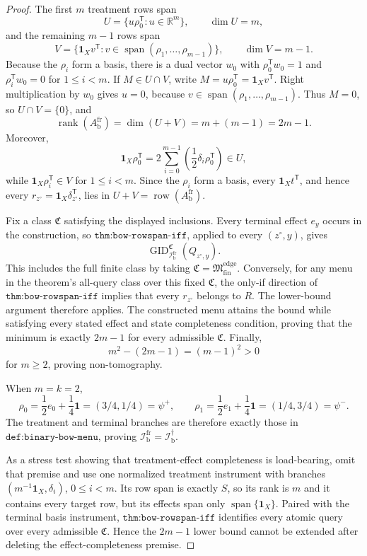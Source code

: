 \documentclass{article}
\begin{document}
\begin{proof}
The first \(m\) treatment rows span
\[
U=\{u\rho_0^{\mathsf T}:u\in\mathbb R^m\},
\qquad \dim U=m,
\]
and the remaining \(m-1\) rows span
\[
V=\{\mathbf 1_Xv^{\mathsf T}:v\in\operatorname{span}(\rho_1,\ldots,\rho_{m-1})\},
\qquad \dim V=m-1.
\]
Because the \(\rho_i\) form a basis, there is a dual vector \(w_0\) with \(\rho_0^{\mathsf T}w_0=1\) and \(\rho_i^{\mathsf T}w_0=0\) for \(1\leq i<m\).  If \(M\in U\cap V\), write \(M=u\rho_0^{\mathsf T}=\mathbf 1_Xv^{\mathsf T}\).  Right multiplication by \(w_0\) gives \(u=0\), because \(v\in\operatorname{span}(\rho_1,\ldots,\rho_{m-1})\).  Thus \(M=0\), so \(U\cap V=\{0\}\), and
\[
\operatorname{rank}(A_{\mathrm b}^{\mathrm{fr}})
=\dim(U+V)=m+(m-1)=2m-1.
\]
Moreover,
\[
\mathbf 1_X\rho_0^{\mathsf T}
=2\sum_{i=0}^{m-1}\left(\frac12\delta_i\rho_0^{\mathsf T}\right)\in U,
\]
while \(\mathbf 1_X\rho_i^{\mathsf T}\in V\) for \(1\leq i<m\).  Since the \(\rho_i\) form a basis, every \(\mathbf 1_Xt^{\mathsf T}\), and hence every \(r_{z^{\circ}}=\mathbf 1_X\delta_{z^{\circ}}^{\mathsf T}\), lies in \(U+V=\operatorname{row}(A_{\mathrm b}^{\mathrm{fr}})\).

Fix a class \(\mathfrak C\) satisfying the displayed inclusions.  Every terminal effect \(e_y\) occurs in the construction, so \(\texttt{thm:bow-rowspan-iff}\), applied to every \((z^{\circ},y)\), gives
\[
\operatorname{GID}_{\mathcal I_{\mathrm b}^{\mathrm{fr}}}^{\mathfrak C}(Q_{z^{\circ},y}).
\]
This includes the full finite class by taking \(\mathfrak C=\mathfrak M_{\mathrm{fin}}^{\mathrm{edge}}\).  Conversely, for any menu in the theorem's all-query class over this fixed \(\mathfrak C\), the only-if direction of \(\texttt{thm:bow-rowspan-iff}\) implies that every \(r_{z^{\circ}}\) belongs to \(R\).  The lower-bound argument therefore applies.  The constructed menu attains the bound while satisfying every stated effect and state completeness condition, proving that the minimum is exactly \(2m-1\) for every admissible \(\mathfrak C\).  Finally,
\[
m^2-(2m-1)=(m-1)^2>0
\]
for \(m\geq2\), proving non-tomography.

When \(m=k=2\),
\[
\rho_0=\frac12e_0+\frac14\mathbf 1=(3/4,1/4)=\psi^+,
\qquad
\rho_1=\frac12e_1+\frac14\mathbf 1=(1/4,3/4)=\psi^-.
\]
The treatment and terminal branches are therefore exactly those in \(\texttt{def:binary-bow-menu}\), proving \(\mathcal I_{\mathrm b}^{\mathrm{fr}}=\mathcal I_{\mathrm b}^{\dagger}\).

As a stress test showing that treatment-effect completeness is load-bearing, omit that premise and use one normalized treatment instrument with branches \((m^{-1}\mathbf 1_X,\delta_i)\), \(0\leq i<m\).  Its row span is exactly \(S\), so its rank is \(m\) and it contains every target row, but its effects span only \(\operatorname{span}\{\mathbf 1_X\}\).  Paired with the terminal basis instrument, \(\texttt{thm:bow-rowspan-iff}\) identifies every atomic query over every admissible \(\mathfrak C\).  Hence the \(2m-1\) lower bound cannot be extended after deleting the effect-completeness premise.
\end{proof}
\end{document}
